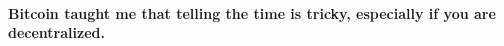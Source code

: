 \paragraph{Bitcoin taught me that telling the time is tricky, especially if you are
decentralized.}

%
%
%
%
%
%
%
